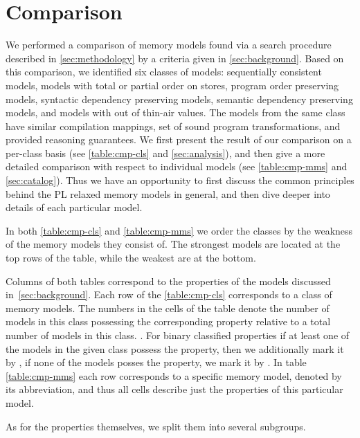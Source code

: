\section{Comparison}

We performed a comparison of memory models 
found via a search procedure described in \cref{sec:methodology} 
by a criteria given in \cref{sec:background}. 
Based on this comparison, we identified six classes of models:
sequentially consistent models, %
models with total or partial order on stores, %
program order preserving models, %
syntactic dependency preserving models, %
semantic dependency preserving models, %
and models with out of thin-air values. %
The models from the same class have similar compilation mappings, 
set of sound program transformations, and provided reasoning guarantees.
We first present the result of our comparison on a per-class basis 
(see \cref{table:cmp-cls} and \cref{sec:analysis}), and 
then give a more detailed comparison with respect to individual models
(see \cref{table:cmp-mms} and \cref{sec:catalog}).
Thus we have an opportunity to first discuss the common principles
behind the PL relaxed memory models in general, and then dive deeper 
into details of each particular model. 

In both \cref{table:cmp-cls} and \cref{table:cmp-mms} we order
the classes by the weakness of the memory models they consist of.  
The strongest models are located at the top rows of the table, 
while the weakest are at the bottom.  

Columns of both tables correspond to the properties 
of the models discussed in~\cref{sec:background}.
Each row of the \cref{table:cmp-cls} corresponds to a class of memory models.
The numbers in the cells of the table denote the number of models in this 
class possessing the corresponding property relative to a total number 
of models in this class. .
For binary classified properties if at least one of the models 
in the given class possess the property,
then we additionally mark it by \cmark, 
if none of the models posses the property, we mark it by \xmark.    
In table \cref{table:cmp-mms} each row corresponds to 
a specific memory model, denoted by its abbreviation, 
and thus all cells describe just the properties 
of this particular model. 

As for the properties themselves, we split them into several subgroups.

